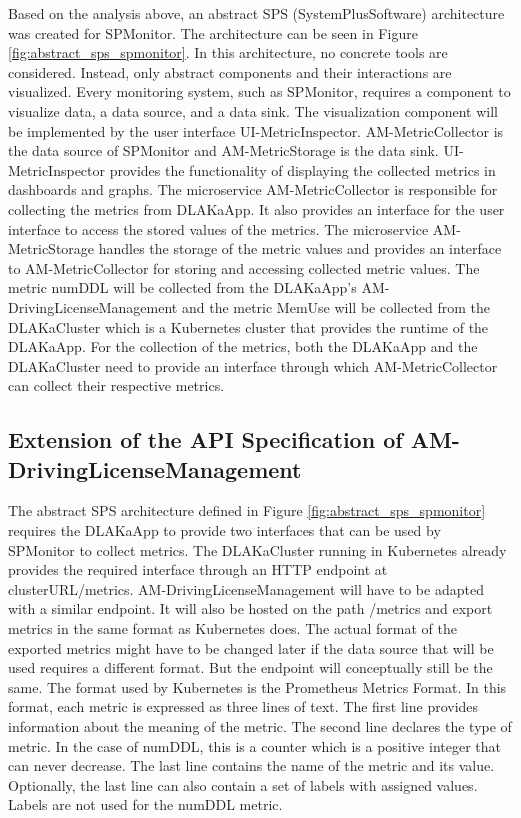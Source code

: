 Based on the analysis above, an abstract SPS (SystemPlusSoftware) architecture
was created for SPMonitor. The architecture can be seen in Figure
\ref{fig:abstract_sps_spmonitor}. In this architecture, no concrete tools are
considered. Instead, only abstract components and their interactions are
visualized. 
Every monitoring system, such as SPMonitor, requires a component to visualize data,
a data source, and a data sink. The visualization component will be
implemented by the user interface UI-MetricInspector. AM-MetricCollector is the
data source of SPMonitor and AM-MetricStorage is the data sink.
UI-MetricInspector provides the functionality of displaying the collected
metrics in dashboards and graphs. The microservice AM-MetricCollector is
responsible for collecting the metrics from DLAKaApp. It also provides an
interface for the user interface to access the stored values of the metrics.
The microservice AM-MetricStorage handles the storage of the metric values and
provides an interface to AM-MetricCollector for storing and accessing collected
metric values. The metric numDDL will be collected from the DLAKaApp's
AM-DrivingLicenseManagement and the metric MemUse will be collected
from the DLAKaCluster which is a Kubernetes cluster that provides the runtime
of the DLAKaApp. For the collection of the metrics, both the DLAKaApp and the
DLAKaCluster need to provide an interface through which AM-MetricCollector can
collect their respective metrics.

\subsection{Extension of the API Specification of AM-DrivingLicenseManagement}

The abstract SPS architecture defined in Figure
\ref{fig:abstract_sps_spmonitor} requires the DLAKaApp to provide two
interfaces that can be used by SPMonitor to collect metrics. The DLAKaCluster
running in Kubernetes already provides the required interface through an HTTP
endpoint at clusterURL/metrics. AM-DrivingLicenseManagement will have to be adapted with a similar endpoint. It
will also be hosted on the path /metrics and export metrics in the same format
as Kubernetes does. The actual format of the exported metrics might have to be
changed later if the data source that will be used requires a different format.
But the endpoint will conceptually still be the same. The format used by
Kubernetes is the Prometheus Metrics Format. In this format, each metric is
expressed as three lines of text. The first line provides information about the
meaning of the metric. The second line declares the type of metric. In the case
of numDDL, this is a counter which is a positive integer that can never
decrease. The last line contains the name of the metric and its value.
Optionally, the last line can also contain a set of labels with assigned
values. Labels are not used for the numDDL metric. 

